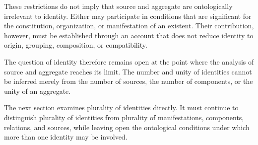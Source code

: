 These restrictions do not imply that
source and aggregate are ontologically
irrelevant to identity. Either may
participate in conditions that are
significant for the constitution,
organization, or manifestation of
an existent. Their contribution,
however, must be established through
an account that does not reduce
identity to origin, grouping,
composition, or compatibility.

The question of identity therefore
remains open at the point where the
analysis of source and aggregate
reaches its limit. The number and
unity of identities cannot be inferred
merely from the number of sources,
the number of components, or the
unity of an aggregate.

The next section examines plurality
of identities directly. It must
continue to distinguish plurality
of identities from plurality of
manifestations, components, relations,
and sources, while leaving open
the ontological conditions under
which more than one identity may
be involved.

